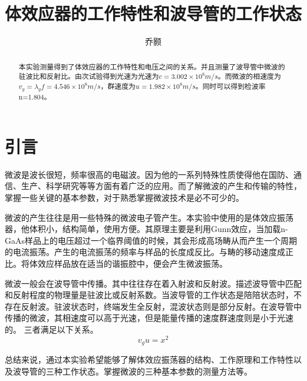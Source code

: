 \documentclass[aps,pre,12pt,preprint,onecolumn,showpacs,showkeys,UTF8]{revtex4-1}
\begin{document}
\title{\bf\heiti{}体效应器的工作特性和波导管的工作状态\vspace{15mm}}
\author{\fangsong 乔颢\vspace{2mm}}
\begin{abstract} 
	\vspace{10mm}
	\begin{spacing}{1.5}
		\songti{}本实验测量得到了体效应器的工作特性和电压之间的关系。并且测量了波导管中微波的驻波比和反射比。由次试验得到光速为光速为$c=3.002\times10^8m/s$。而微波的相速度为$v_g=\lambda_g f = 4.546\times 10^8m/s$，群速度为$u = 1.982 \times 10^8 m/s$。同时可以得到检波率n=1.804。

	\end{spacing}
\end{abstract}

\maketitle

\section{引言}

微波是波长很短，频率很高的电磁波。因为他的一系列特殊性质使得他在国防、通信、生产、科学研究等等方面有着广泛的应用。而了解微波的产生和传输的特性，掌握一些关键的基本参数，对于熟悉掌握微波技术是必不可少的。

微波的产生往往是用一些特殊的微波电子管产生。本实验中使用的是体效应振荡器，他体积小，结构简单，使用方便。其原理主要是利用Gunn效应，当加载n-GaAs样品上的电压超过一个临界阈值的时候，其会形成高场畴从而产生一个周期的电流振荡。产生的电流振荡的频率与样品的长度成反比。与畴的移动速度成正比。将体效应样品放在适当的谐振腔中，便会产生微波振荡。

微波一般会在波导管中传播。其中往往存在着入射波和反射波。描述波导管中匹配和反射程度的物理量是驻波比或反射系数。当波导管的工作状态是陪陪状态时，不存在反射波。驻波状态时，终端发生全反射，混波状态则是部分反射。在波导管中传播的微波，其相速度可以高于光速，但是能量传播的速度群速度则是小于光速的。 三者满足以下关系。
\begin{equation}
	v_g u = x^2
\end{equation}

总结来说，通过本实验希望能够了解体效应振荡器的结构、工作原理和工作特性以及波导管的三种工作状态。掌握微波的三种基本参数的测量方法等。
\end{document}
